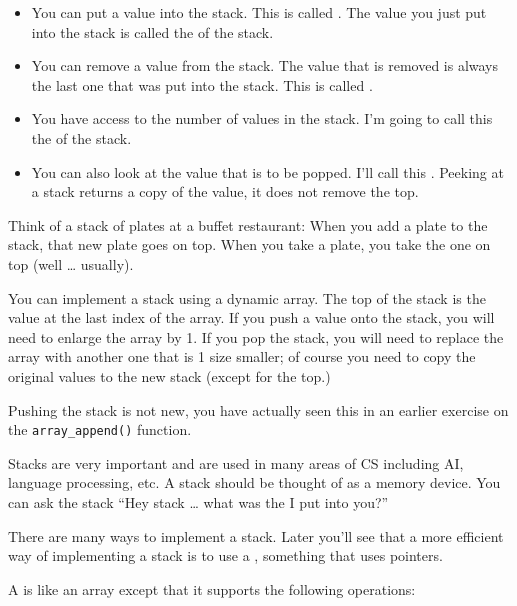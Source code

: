 \begin{itemize}
\item
  You can put a value into the stack. This is called . The
  value you just put into the stack is called the  of the
  stack.
\item
  You can remove a value from the stack. The value that is removed is
  always the last one that was put into the stack. This is called
  .
\item
  You have access to the number of values in the stack. I'm going to
  call this the  of the stack.
\item
  You can also look at the value that is to be popped. I'll call this
  . Peeking at a stack returns a copy of the value, it does
  not remove the top.
\end{itemize}

Think of a stack of plates at a buffet restaurant: When you add a plate to the stack, that new plate goes on top. When you take a plate, you take the one on top (well \ldots{} usually).

You can implement a stack using a dynamic array. The top of the stack is the value at the last index of the array. If you push a value onto the stack, you will need to enlarge the array by 1. If you pop the stack, you will need to replace the array with another one that is 1 size smaller; of course you need to copy the original values to the new stack (except for the top.)

Pushing the stack is not new, you have actually seen this in an earlier exercise on the \texttt{array\_append()} function.

Stacks are very important and are used in many areas of CS including AI, language processing, etc. A stack should be thought of as a memory device. You can ask the stack ``Hey stack \ldots{} what was the  I put into you?''


There are many ways to implement a stack. Later you'll see that a more efficient way of implementing a stack is to use a , something that uses pointers.

\newpage{}

A  is like an array except that it supports the following operations:

